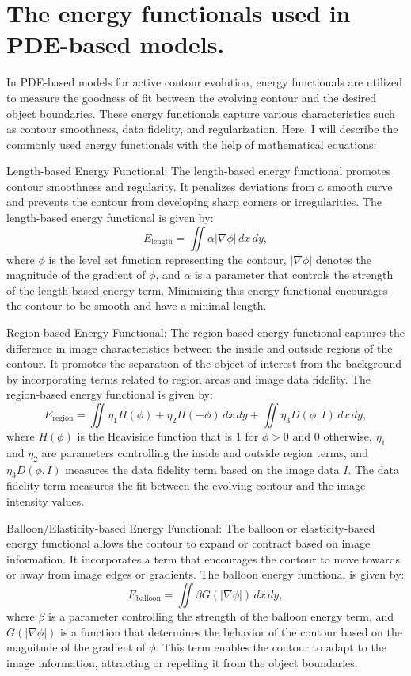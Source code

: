 \documentclass[]{report}
\begin{document}
\section*{The energy functionals used in PDE-based models.}
In PDE-based models for active contour evolution, energy functionals are utilized to measure the goodness of fit between the evolving contour and the desired object boundaries. These energy functionals capture various characteristics such as contour smoothness, data fidelity, and regularization. Here, I will describe the commonly used energy functionals with the help of mathematical equations:

Length-based Energy Functional:
The length-based energy functional promotes contour smoothness and regularity. It penalizes deviations from a smooth curve and prevents the contour from developing sharp corners or irregularities. The length-based energy functional is given by:
\begin{equation}
    E_{\text{length}} = \iint \alpha \lvert \nabla\phi \rvert \, dx \, dy,
\end{equation}
where $\phi$ is the level set function representing the contour, $\lvert \nabla\phi \rvert$ denotes the magnitude of the gradient of $\phi$, and $\alpha$ is a parameter that controls the strength of the length-based energy term. Minimizing this energy functional encourages the contour to be smooth and have a minimal length.

Region-based Energy Functional:
The region-based energy functional captures the difference in image characteristics between the inside and outside regions of the contour. It promotes the separation of the object of interest from the background by incorporating terms related to region areas and image data fidelity. The region-based energy functional is given by:
\begin{equation}
    E_{\text{region}} = \iint \eta_1 H(\phi) + \eta_2 H(-\phi) \, dx \, dy + \iint \eta_3 D(\phi, I) \, dx \, dy,
\end{equation}
where $H(\phi)$ is the Heaviside function that is 1 for $\phi > 0$ and 0 otherwise, $\eta_1$ and $\eta_2$ are parameters controlling the inside and outside region terms, and $\eta_3 D(\phi, I)$ measures the data fidelity term based on the image data $I$. The data fidelity term measures the fit between the evolving contour and the image intensity values.

Balloon/Elasticity-based Energy Functional:
The balloon or elasticity-based energy functional allows the contour to expand or contract based on image information. It incorporates a term that encourages the contour to move towards or away from image edges or gradients. The balloon energy functional is given by:
\begin{equation}
    E_{\text{balloon}} = \iint \beta G(\lvert \nabla\phi \rvert) \, dx \, dy,
\end{equation}
where $\beta$ is a parameter controlling the strength of the balloon energy term, and $G(\lvert \nabla\phi \rvert)$ is a function that determines the behavior of the contour based on the magnitude of the gradient of $\phi$. This term enables the contour to adapt to the image information, attracting or repelling it from the object boundaries.
\end{document}
